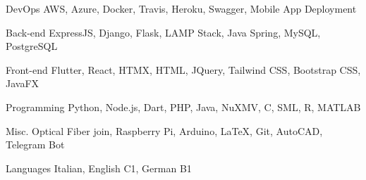 

\begin{cvskills}

  \cvskill
    {DevOps} %
    {AWS, Azure, Docker, Travis, Heroku, Swagger, Mobile App Deployment} %

  \cvskill
    {Back-end} %
    {ExpressJS, Django, Flask, LAMP Stack, Java Spring, MySQL, PostgreSQL} %

  \cvskill
    {Front-end} %
    {Flutter, React, HTMX, HTML, JQuery, Tailwind CSS, Bootstrap CSS, JavaFX} %

  \cvskill
    {Programming} %
    {Python, Node.js, Dart, PHP, Java, NuXMV, C, SML, R, MATLAB} %

  \cvskill
  {Misc.} %
  {Optical Fiber join, Raspberry Pi, Arduino, LaTeX, Git, AutoCAD, Telegram Bot} %

  \cvskill
    {Languages} %
    {Italian, English C1, German B1} %

\end{cvskills}
